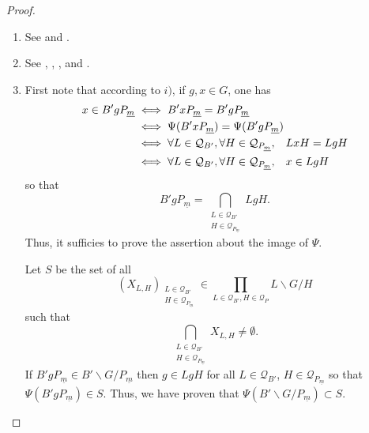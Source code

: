 \documentclass[pdftex]{sigma}
\numberwithin{equation}{section}
\theoremstyle{definition}
\theoremstyle{plain}
\theoremstyle{plain}
\theoremstyle{plain}
\theoremstyle{plain}
\begin{document}
\begin{proof} $ $
	\begin{enumerate}[label = $\roman*)$]
		\item See  and .
		
		
		\item See , , ,  and .
		
		
		\item First note that according to $i)$, if $g,x \in G$, one has
		\begin{align*}
			x \in B'gP_{\underline m} &\iff B'xP_{\underline m} = B'gP_{\underline m}\\
			&\iff \Psi(B'xP_{\underline m}) = \Psi(B'gP_{\underline m}) \\
			&\iff \forall L \in \mathcal Q_{B'}, \forall H \in \mathcal Q_{P_{\underline m}}, \hspace{3mm} LxH = LgH \\
			&\iff \forall L \in \mathcal Q_{B'}, \forall H \in \mathcal Q_{P_{\underline m}}, \hspace{3mm} x \in LgH
		\end{align*}
		so that
		\begin{equation*}
			B'gP_{\underline m} = \bigcap_{\substack{L \in \mathcal Q_{B'} \\ H \in \mathcal Q_{P_{\underline m}}}}LgH.
		\end{equation*}
		Thus, it sufficies to prove the assertion about the image of $\Psi$.
		
		Let $S$ be the set of all
		\begin{equation*}
			(X_{L,H})_{\substack{L \in \mathcal Q_{B'} \\ H \in \mathcal Q_{P_{\underline m}}}} \in \displaystyle \prod_{L \in \mathcal Q_{B'}, H \in \mathcal Q_P} L\backslash G/H 
		\end{equation*}
		such that
		\begin{equation*}
			\bigcap_{\substack{L \in \mathcal Q_{B'} \\ H \in \mathcal Q_{P_{\underline m}}}} X_{L,H} \neq \emptyset.
		\end{equation*}
		If $B'gP_{\underline m} \in B'\backslash G/P_{\underline m}$ then $g \in LgH$ for all $L \in \mathcal Q_{B'}$, $H \in \mathcal Q_{P_{\underline m}}$ so that $\Psi(B'gP_{\underline m}) \in S$.
		Thus, we have proven that $\Psi(B'\backslash G/P_{\underline m}) \subset S$.


\end{enumerate}
\end{proof}
\end{document}
